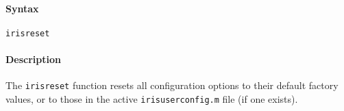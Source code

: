 


	\paragraph{Syntax}

\begin{verbatim}
irisreset
\end{verbatim}

\paragraph{Description}

The \texttt{irisreset} function resets all configuration options to
their default factory values, or to those in the active
\texttt{irisuserconfig.m} file (if one exists).



